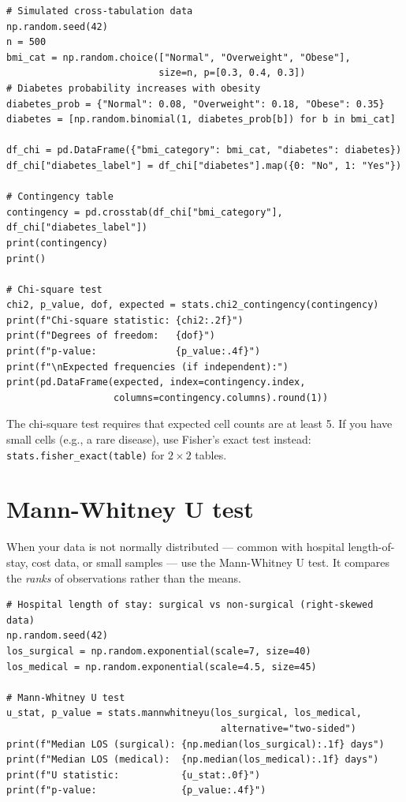 \begin{verbatim}
# Simulated cross-tabulation data
np.random.seed(42)
n = 500
bmi_cat = np.random.choice(["Normal", "Overweight", "Obese"],
                           size=n, p=[0.3, 0.4, 0.3])
# Diabetes probability increases with obesity
diabetes_prob = {"Normal": 0.08, "Overweight": 0.18, "Obese": 0.35}
diabetes = [np.random.binomial(1, diabetes_prob[b]) for b in bmi_cat]

df_chi = pd.DataFrame({"bmi_category": bmi_cat, "diabetes": diabetes})
df_chi["diabetes_label"] = df_chi["diabetes"].map({0: "No", 1: "Yes"})

# Contingency table
contingency = pd.crosstab(df_chi["bmi_category"], df_chi["diabetes_label"])
print(contingency)
print()

# Chi-square test
chi2, p_value, dof, expected = stats.chi2_contingency(contingency)
print(f"Chi-square statistic: {chi2:.2f}")
print(f"Degrees of freedom:   {dof}")
print(f"p-value:              {p_value:.4f}")
print(f"\nExpected frequencies (if independent):")
print(pd.DataFrame(expected, index=contingency.index,
                   columns=contingency.columns).round(1))
\end{verbatim}

\begin{clinicalnote}
The chi-square test requires that expected cell counts are at least 5. If you have small cells (e.g., a rare disease), use Fisher's exact test instead: \texttt{stats.fisher\_exact(table)} for $2 \times 2$ tables.
\end{clinicalnote}

\section{Mann-Whitney U test}

When your data is not normally distributed --- common with hospital length-of-stay, cost data, or small samples --- use the Mann-Whitney U test. It compares the \emph{ranks} of observations rather than the means.

\begin{verbatim}
# Hospital length of stay: surgical vs non-surgical (right-skewed data)
np.random.seed(42)
los_surgical = np.random.exponential(scale=7, size=40)
los_medical = np.random.exponential(scale=4.5, size=45)

# Mann-Whitney U test
u_stat, p_value = stats.mannwhitneyu(los_surgical, los_medical,
                                      alternative="two-sided")
print(f"Median LOS (surgical): {np.median(los_surgical):.1f} days")
print(f"Median LOS (medical):  {np.median(los_medical):.1f} days")
print(f"U statistic:           {u_stat:.0f}")
print(f"p-value:               {p_value:.4f}")
\end{verbatim}

